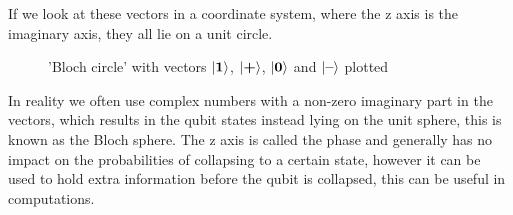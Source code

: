 \vspace{\baselineskip}
\noindent
If we look at these vectors in a coordinate system, where the z axis is the imaginary axis, they all lie on a unit circle.
\begin{figure}[H]
    \centering
    \caption{'Bloch circle' with vectors $\ket{\mathbf{1}}$, $\ket{\textbf{+}}$, $\ket{\mathbf{0}}$ and $\ket{\textbf{--}}$ plotted}
    \label{fig:block_cirkle}
\end{figure}

\noindent
In reality we often use complex numbers with a non-zero imaginary part in the vectors, which results in the qubit states instead lying on the unit sphere, this is known as the Bloch sphere. The z axis is called the phase and generally has no impact on the probabilities of collapsing to a certain state, however it can be used to hold extra information before the qubit is collapsed, this can be useful in computations.


